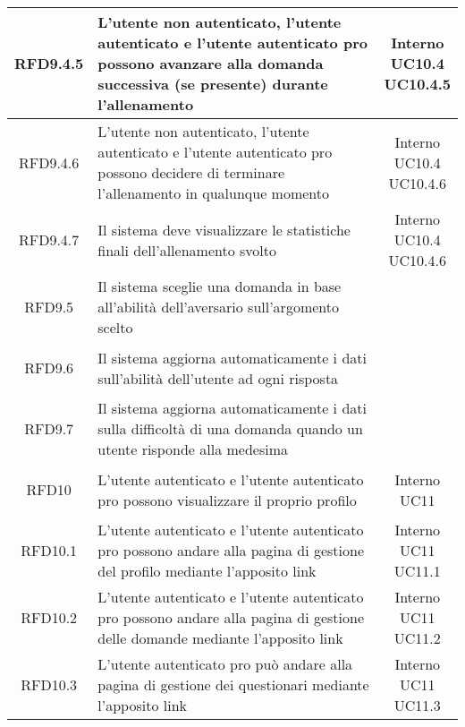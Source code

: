 \begin{longtable}{|c|>{\centering}m{7cm}|c|}
			 \hypertarget{{RFD9.4.5}}{{RFD9.4.5}} & L'utente non autenticato, l'utente autenticato e l'utente autenticato pro possono avanzare alla domanda successiva (se presente) durante l'allenamento & \makecell{Interno\\ UC10.4 \\UC10.4.5 } \\ \hline
			 \hypertarget{{RFD9.4.6}}{{RFD9.4.6}} & L'utente non autenticato, l'utente autenticato e l'utente autenticato pro possono decidere di terminare l'allenamento in qualunque momento & \makecell{Interno\\ UC10.4 \\UC10.4.6 } \\ \hline
			 \hypertarget{{RFD9.4.7}}{{RFD9.4.7}} & Il sistema deve visualizzare le statistiche finali dell'allenamento svolto & \makecell{Interno\\ UC10.4 \\UC10.4.6 } \\ \hline
			 \hypertarget{{RFD9.5}}{{RFD9.5}} & Il sistema sceglie una domanda in base all'abilità dell'aversario sull'argomento scelto & \makecell{Interno } \\ \hline
			 \hypertarget{{RFD9.6}}{{RFD9.6}} & Il sistema aggiorna automaticamente i dati sull'abilità dell'utente ad ogni risposta & \makecell{Interno } \\ \hline
			 \hypertarget{{RFD9.7}}{{RFD9.7}} & Il sistema aggiorna automaticamente i dati sulla difficoltà di una domanda quando un utente risponde alla medesima & \makecell{Interno } \\ \hline
			 \hypertarget{{RFD10}}{{RFD10}} & L’utente autenticato e l’utente autenticato pro possono visualizzare il proprio profilo & \makecell{Interno\\ UC11 } \\ \hline
			 \hypertarget{{RFD10.1}}{{RFD10.1}} & L’utente autenticato e l’utente autenticato pro possono andare alla pagina di gestione del profilo mediante l’apposito link & \makecell{Interno\\ UC11 \\UC11.1 } \\ \hline
			 \hypertarget{{RFD10.2}}{{RFD10.2}} & L’utente autenticato e l’utente autenticato pro possono andare alla pagina di gestione delle domande mediante l’apposito link & \makecell{Interno\\ UC11 \\UC11.2 } \\ \hline
			 \hypertarget{{RFD10.3}}{{RFD10.3}} & L’utente autenticato pro può andare alla pagina di gestione dei questionari mediante l’apposito link & \makecell{Interno\\ UC11 \\UC11.3 } \\ \hline

\end{longtable}
